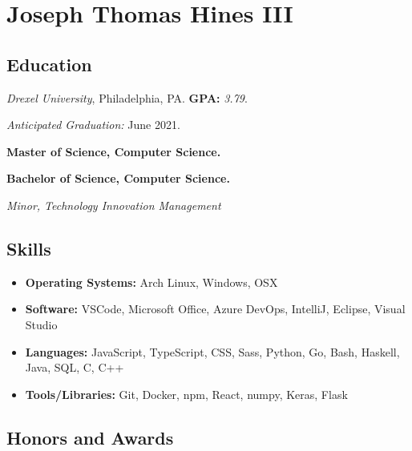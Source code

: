\documentclass[10pt]{article}
\begin{document}
\section*{\huge Joseph Thomas Hines III}
\label{sec:title}

\begin{multicols}{2}
\setlength\multicolsep{0pt}

\subsection*{Education}%
\label{sub:Education}

\vspace{-\topsep}
\emph{Drexel University}, Philadelphia, PA. \textbf{GPA:} \emph{3.79}.

\emph{Anticipated Graduation:} June 2021.

\vspace{0.2em}

\textbf{Master of Science, Computer Science.}

\textbf{Bachelor of Science, Computer Science.}

\emph{Minor, Technology Innovation Management}

\vspace{-\topsep}
\subsection*{Skills}%
\label{sub:Skills}

\vspace{-\topsep}
\begin{itemize}[leftmargin=*,noitemsep,topsep=0pt]
\item \textbf{Operating Systems:} Arch Linux, Windows, OSX
\item \textbf{Software:} VSCode, Microsoft Office, Azure DevOps,
	IntelliJ, Eclipse, Visual Studio
\item \textbf{Languages:} JavaScript, TypeScript, CSS, Sass, Python, Go,
	Bash, Haskell, Java, SQL, C, C++
\item \textbf{Tools/Libraries:} Git, Docker, npm, React, numpy, Keras, Flask
\end{itemize}

\vfill\null
\columnbreak

\subsection*{Honors and Awards}%
\label{sub:Honors and Awards}


\end{multicols}
\end{document}
